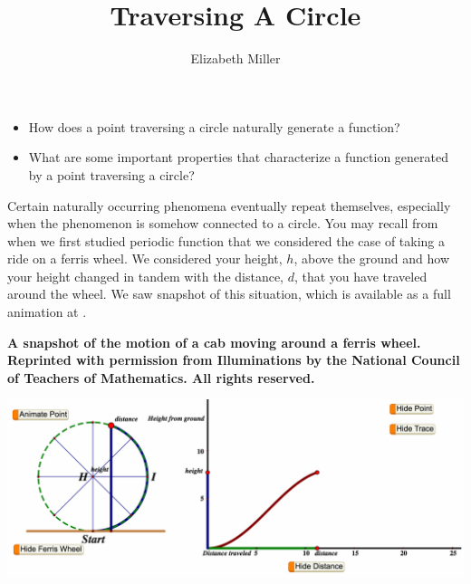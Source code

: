 \documentclass[nooutcomes, noauthor]{ximera}
\author{Elizabeth Miller}
\title{Traversing A Circle}
\begin{document}
\licenseAPC
\begin{abstract}
  
\end{abstract}
\maketitle



\begin{motivatingQuestions}\begin{itemize}
\item How does a point traversing a circle naturally generate a function?
\item What are some important properties that characterize a function generated by a point traversing a circle?
\end{itemize}\end{motivatingQuestions}



Certain naturally occurring phenomena eventually repeat themselves, especially when the phenomenon is somehow connected to a circle. You may recall from when we first studied periodic function that we considered the case of taking a ride on a ferris wheel.  We considered your height, \(h\), above the ground and how your height changed in tandem with the distance, \(d\), that you have traveled around the wheel.  We saw snapshot of this situation, which is available as a full animation at .%

\begin{center}
\textbf{A snapshot of the motion of a cab moving around a ferris wheel.  Reprinted with permission from Illuminations by the National Council of Teachers of Mathematics. All rights reserved.}
\end{center}
\begin{image}
\includegraphics[width=\textwidth]{traversing-ferris-wheel-animation.pdf}
\end{image}
\end{document}
